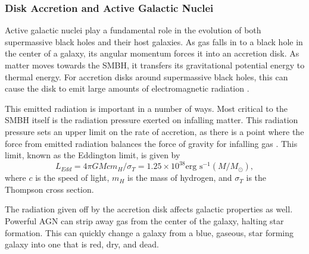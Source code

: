 \subsubsection{Disk Accretion and Active Galactic Nuclei}

Active galactic nuclei play a fundamental role in the evolution of both supermassive black holes and their host galaxies.  As gas falls in to a black hole in the center of a galaxy, its angular momentum forces it into an accretion disk.  As matter moves towards the SMBH, it transfers its gravitational potential energy to thermal energy.  For accretion disks around supermassive black holes, this can cause the disk to emit large amounts of electromagnetic radiation \citep{lin_1996}.

This emitted radiation is important in a number of ways.  Most critical to the SMBH itself is the radiation pressure exerted on infalling matter.  This radiation pressure sets an upper limit on the rate of accretion, as there is a point where the force from emitted radiation balances the force of gravity for infalling gas \citep{rybicki_lightman_1979}.  This limit, known as the Eddington limit, is given by
\begin{equation} \label{eq:L_Edd}
  L_{Edd} = 4 \pi G M c m_{H} / \sigma_{T} = 1.25 \times 10^{38} \textrm{erg s}^{-1} (M / M_{\odot}),
\end{equation}
where $c$ is the speed of light, $m_{H}$ is the mass of hydrogen, and $\sigma_{T}$ is the Thompson cross section.

The radiation given off by the accretion disk affects galactic properties as well.  Powerful AGN can strip away gas from the center of the galaxy, halting star formation.  This can quickly change a galaxy from a blue, gaseous, star forming galaxy into one that is red, dry, and dead.







